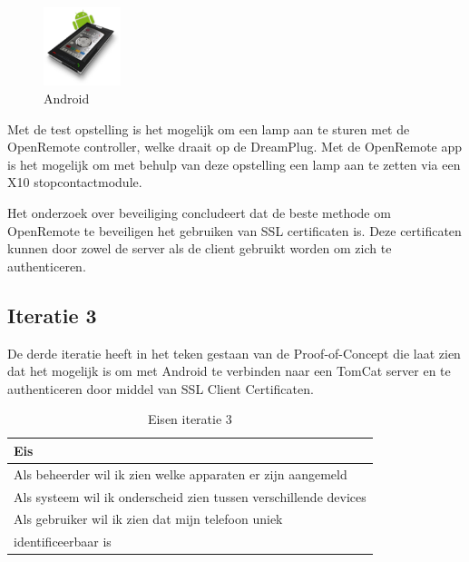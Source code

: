 \documentclass[]{article}
\begin{document}
\begin{figure}
  \begin{center}
    \includegraphics[width=0.20\textwidth]{android.pdf}
  \end{center}
  \caption{Android}
\end{figure}

Met de test opstelling is het mogelijk om een lamp
aan te sturen met de OpenRemote controller, welke draait op de
DreamPlug. Met de OpenRemote app is het mogelijk om met behulp van deze
opstelling een lamp aan te zetten via een X10 stopcontactmodule.

Het onderzoek over beveiliging concludeert dat de beste methode om
OpenRemote te beveiligen het gebruiken van SSL certificaten is. Deze
certificaten kunnen door zowel de server als de client gebruikt worden om
zich te authenticeren.

\subsection{Iteratie 3}
De derde iteratie heeft in het teken gestaan van de Proof-of-Concept die laat zien
dat het mogelijk is om met Android te verbinden naar een TomCat server en
te authenticeren door middel van SSL Client Certificaten.

\begin{table}[htpb]
  \caption{Eisen iteratie 3}
  \begin{center}
    \begin{tabular}{|| l ||}\hline
        Eis                                                              \\\hline\hline
        Als beheerder wil ik zien welke apparaten er zijn aangemeld      \\\hline
        Als systeem wil ik onderscheid zien tussen verschillende devices \\\hline
        Als gebruiker wil ik zien dat mijn telefoon uniek                \\ 
        identificeerbaar is                                              \\\hline
    \end{tabular}                                                         
  \end{center}                                                            
\end{table}                                                               
\end{document}
